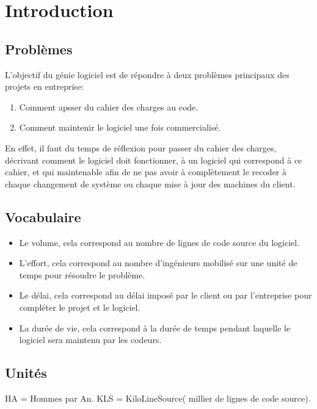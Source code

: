 \section{Introduction}
\subsection{Problèmes}
L'objectif du génie logiciel est de répondre à deux problèmes principaux des projets en entreprise:
\begin{enumerate}
	\item Comment apsser du cahier des charges au code.
	\item Comment maintenir le logiciel une fois commercialisé.
\end{enumerate}

En effet, il faut du temps de réflexion pour passer du cahier des charges, décrivant comment le logiciel
doit fonctionner, à un logiciel qui correspond à ce cahier, et qui maintenable afin de ne pas avoir à
complètement le recoder à chaque changement de système ou chaque mise à jour des machines du client.

\subsection{Vocabulaire}
\begin{itemize}
	\item Le volume, cela correspond au nombre de lignes de code source du logiciel.
	\item L'effort, cela correspond au nombre d'ingénieurs mobilisé sur une unité de temps pour résoudre le
	problème.
	\item Le délai, cela correspond au délai imposé par le client ou par l'entreprise pour compléter le projet et
	le logiciel.
	\item La durée de vie, cela correspond à la durée de temps pendant laquelle le logiciel sera maintenu par
	les codeurs.
\end{itemize}

\subsection{Unités}
HA = Hommes par An.
KLS = KiloLineSource( millier de lignes de code source).
